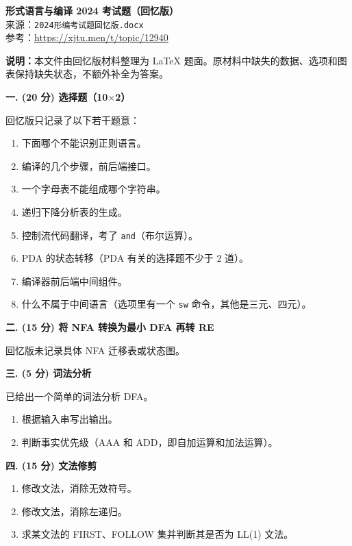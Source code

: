 \documentclass[UTF8,zihao=-4]{ctexart}
\newcommand{\score}[1]{\textbf{(#1 分)}}
\newcommand{\kw}[1]{\texttt{#1}}
\newcommand{\qtitle}[3]{\vspace{0.8em}\textbf{#1. \score{#2} #3}\par}
\begin{document}
\begin{center}
  {\Large\bfseries 形式语言与编译 2024 考试题（回忆版）}\\
  \vspace{0.3em}
  {\normalsize 来源：\kw{2024形编考试题回忆版.docx}}\\
  {\small 参考：\url{https://xjtu.men/t/topic/12940}}
\end{center}

\textbf{说明：}本文件由回忆版材料整理为 \LaTeX{} 题面。原材料中缺失的数据、选项和图表保持缺失状态，不额外补全为答案。

\qtitle{一}{20}{选择题（10$\times$2）}

回忆版只记录了以下若干题意：
\begin{enumerate}
  \item 下面哪个不能识别正则语言。
  \item 编译的几个步骤，前后端接口。
  \item 一个字母表不能组成哪个字符串。
  \item 递归下降分析表的生成。
  \item 控制流代码翻译，考了 \kw{and}（布尔运算）。
  \item PDA 的状态转移（PDA 有关的选择题不少于 2 道）。
  \item 编译器前后端中间组件。
  \item 什么不属于中间语言（选项里有一个 \kw{sw} 命令，其他是三元、四元）。
\end{enumerate}

\qtitle{二}{15}{将 NFA 转换为最小 DFA 再转 RE}

回忆版未记录具体 NFA 迁移表或状态图。

\qtitle{三}{5}{词法分析}

已给出一个简单的词法分析 DFA。
\begin{enumerate}[label=(\arabic*)]
  \item 根据输入串写出输出。
  \item 判断事实优先级（AAA 和 ADD，即自加运算和加法运算）。
\end{enumerate}

\qtitle{四}{15}{文法修剪}

\begin{enumerate}[label=(\arabic*)]
  \item 修改文法，消除无效符号。
  \item 修改文法，消除左递归。
  \item 求某文法的 FIRST、FOLLOW 集并判断其是否为 LL(1) 文法。
\end{enumerate}
\end{document}
